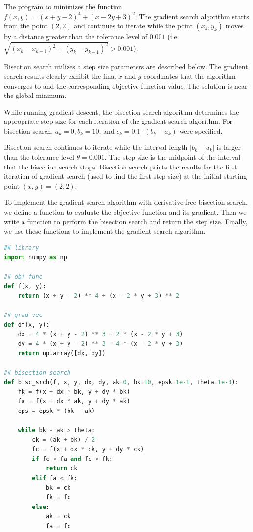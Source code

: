 \documentclass{article}
\begin{document}
\begin{enumerate}
    The program to minimizes the function $f(x,y)=(x+y-2)^4+(x-2y+3)^2$. The gradient search algorithm starts from the point $(2,2)$ and continues to iterate while the point $(x_k, y_k)$ moves by a distance greater than the tolerance level of $0.001$ (i.e. $\sqrt{(x_k - x_{k-1})^2 + (y_k - y_{k-1})^2} > 0.001$).
    
    Bisection search utilizes a step size parameters are described below. The gradient search results clearly exhibit the final $x$ and $y$ coordinates that the algorithm converges to and the corresponding objective function value. The solution is near the global minimum.
    
    While running gradient descent, the bisection search algorithm determines the appropriate step size for each iteration of the gradient search algorithm. For bisection search, $a_k = 0, b_k = 10$, and $\epsilon_k = 0.1 \cdot (b_k - a_k)$ were specified. 
    
    Bisection search continues to iterate while the interval length $|b_k - a_k|$ is larger than the tolerance level $\theta = 0.001$. The step size is the midpoint of the interval that the bisection search stops. Bisection search prints the results for the first iteration of gradient search (used to find the first step size) at the initial starting point $(x, y) = (2, 2)$.
    
    To implement the gradient search algorithm with derivative-free bisection search, we define a function to evaluate the objective function and its gradient. Then we write a function to perform the bisection search and return the step size. Finally, we use these functions to implement the gradient search algorithm.\\

\begin{lstlisting}[language=Python, title=Fig. Python 2]
## library
import numpy as np

## obj func
def f(x, y):
    return (x + y - 2) ** 4 + (x - 2 * y + 3) ** 2

## grad vec
def df(x, y):
    dx = 4 * (x + y - 2) ** 3 + 2 * (x - 2 * y + 3)
    dy = 4 * (x + y - 2) ** 3 - 4 * (x - 2 * y + 3)
    return np.array([dx, dy])

## bisection search
def bisc_srch(f, x, y, dx, dy, ak=0, bk=10, epsk=1e-1, theta=1e-3):
    fk = f(x + dx * bk, y + dy * bk)
    fa = f(x + dx * ak, y + dy * ak)
    eps = epsk * (bk - ak)
    
    while bk - ak > theta:
        ck = (ak + bk) / 2
        fc = f(x + dx * ck, y + dy * ck)
        if fc < fa and fc < fk:
            return ck
        elif fa < fk:
            bk = ck
            fk = fc
        else:
            ak = ck
            fa = fc
    

\end{lstlisting}
\end{enumerate}
\end{document}
